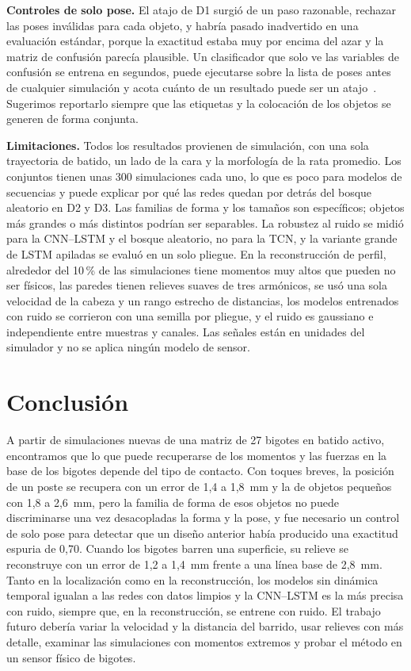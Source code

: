 \documentclass[conference]{IEEEtran}
\begin{document}
\textbf{Controles de solo pose.} El atajo de D1 surgió de un paso razonable, rechazar las poses inválidas para cada objeto, y habría pasado inadvertido en una evaluación estándar, porque la exactitud estaba muy por encima del azar y la matriz de confusión parecía plausible. Un clasificador que solo ve las variables de confusión se entrena en segundos, puede ejecutarse sobre la lista de poses antes de cualquier simulación y acota cuánto de un resultado puede ser un atajo~\cite{geirhos2020}. Sugerimos reportarlo siempre que las etiquetas y la colocación de los objetos se generen de forma conjunta.

\textbf{Limitaciones.} Todos los resultados provienen de simulación, con una sola trayectoria de batido, un lado de la cara y la morfología de la rata promedio. Los conjuntos tienen unas 300 simulaciones cada uno, lo que es poco para modelos de secuencias y puede explicar por qué las redes quedan por detrás del bosque aleatorio en D2 y D3. Las familias de forma y los tamaños son específicos; objetos más grandes o más distintos podrían ser separables. La robustez al ruido se midió para la CNN--LSTM y el bosque aleatorio, no para la TCN, y la variante grande de LSTM apiladas se evaluó en un solo pliegue. En la reconstrucción de perfil, alrededor del 10\,\% de las simulaciones tiene momentos muy altos que pueden no ser físicos, las paredes tienen relieves suaves de tres armónicos, se usó una sola velocidad de la cabeza y un rango estrecho de distancias, los modelos entrenados con ruido se corrieron con una semilla por pliegue, y el ruido es gaussiano e independiente entre muestras y canales. Las señales están en unidades del simulador y no se aplica ningún modelo de sensor.

\section{Conclusión}
A partir de simulaciones nuevas de una matriz de 27 bigotes en batido activo, encontramos que lo que puede recuperarse de los momentos y las fuerzas en la base de los bigotes depende del tipo de contacto. Con toques breves, la posición de un poste se recupera con un error de 1,4 a 1,8~mm y la de objetos pequeños con 1,8 a 2,6~mm, pero la familia de forma de esos objetos no puede discriminarse una vez desacopladas la forma y la pose, y fue necesario un control de solo pose para detectar que un diseño anterior había producido una exactitud espuria de 0,70. Cuando los bigotes barren una superficie, su relieve se reconstruye con un error de 1,2 a 1,4~mm frente a una línea base de 2,8~mm. Tanto en la localización como en la reconstrucción, los modelos sin dinámica temporal igualan a las redes con datos limpios y la CNN--LSTM es la más precisa con ruido, siempre que, en la reconstrucción, se entrene con ruido. El trabajo futuro debería variar la velocidad y la distancia del barrido, usar relieves con más detalle, examinar las simulaciones con momentos extremos y probar el método en un sensor físico de bigotes.
\end{document}

